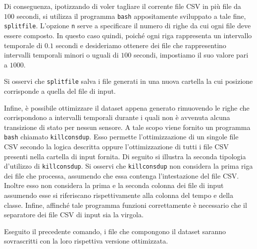 Di conseguenza, ipotizzando di voler tagliare il corrente file \acs{CSV} in più file da $100$ secondi, si utilizza il programma \lstinline[]|bash| appositamente sviluppato a tale fine, \lstinline[]|splitfile|.
\vspace*{8pt}
L'opzione \lstinline[]|n| serve a specificare il numero di righe da cui ogni file deve essere composto. In questo caso quindi, poiché ogni riga rappresenta un intervallo temporale di $0.1$ secondi e desideriamo ottenere dei file che rappresentino intervalli temporali minori o uguali di $100$ secondi, impostiamo il suo valore pari a $1000$.

Si osservi che \lstinline[]|splitfile| salva i file generati in una nuova cartella la cui posizione corrisponde a quella del file di input.

Infine, è possibile ottimizzare il dataset appena generato rimuovendo le righe che corrispondono a intervalli temporali durante i quali non è avvenuta alcuna transizione di stato per nessun sensore. A tale scopo viene fornito un programma \lstinline[]|bash| chiamato \lstinline[]|killconsdup|. Esso permette l'ottimizzazione di un singole file \acs{CSV} secondo la logica descritta oppure l'ottimizzazione di tutti i file \acs{CSV} presenti nella cartella di input fornita. Di seguito si illustra la seconda tipologia d'utilizzo di \lstinline[]|killconsdup|.
\vspace*{8pt}
Si osservi che \lstinline$killconsdup$ non considera la prima riga dei file che processa, assumendo che essa contenga l'intestazione del file \acs{CSV}. Inoltre esso non considera la prima e la seconda colonna dei file di input assumendo esse si riferiscano rispettivamente alla colonna del tempo e della classe. Infine, affinché tale programma funzioni correttamente è necessario che il separatore dei file \acs{CSV} di input sia la virgola.

Eseguito il precedente comando, i file che compongono il dataset saranno sovrascritti con la loro rispettiva versione ottimizzata.
